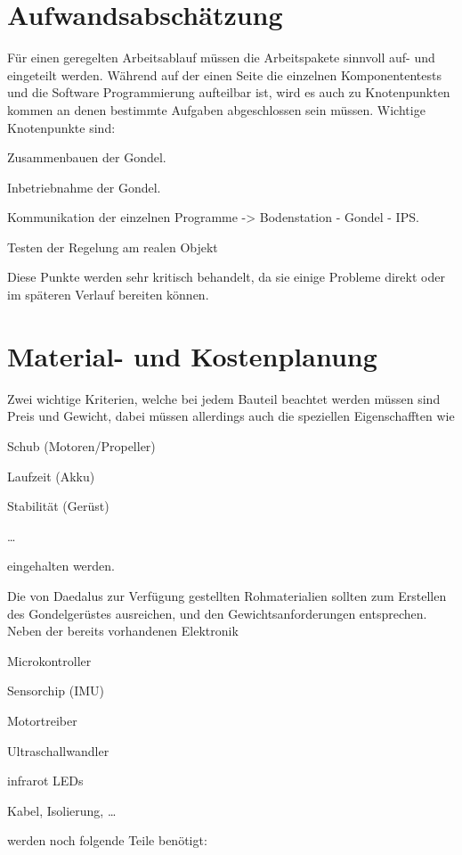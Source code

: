 \documentclass[lang=ngerman,inputenc=utf8,fontsize=10pt]{ldvarticle}
\begin{document}
\section{Aufwandsabschätzung}

Für einen geregelten Arbeitsablauf müssen die Arbeitspakete sinnvoll auf- und eingeteilt werden.
Während auf der einen Seite die einzelnen Komponententests und die Software Programmierung aufteilbar ist, wird es auch zu Knotenpunkten kommen an denen bestimmte Aufgaben abgeschlossen sein müssen. Wichtige Knotenpunkte sind:
\begin{list}{-}{}

\item Zusammenbauen der Gondel.
\item Inbetriebnahme der Gondel.
\item Kommunikation der einzelnen Programme -> Bodenstation - Gondel - IPS.
\item Testen der Regelung am realen Objekt
\end{list}

Diese Punkte werden sehr kritisch behandelt, da sie einige Probleme direkt oder im späteren Verlauf bereiten können.


\section{Material- und Kostenplanung}


Zwei wichtige Kriterien, welche bei jedem Bauteil beachtet werden müssen sind Preis und Gewicht, dabei müssen allerdings auch die speziellen Eigenschafften wie
\begin{list}{-}{}
\item Schub (Motoren/Propeller)
\item Laufzeit (Akku)
\item Stabilität (Gerüst)
\item …
\end{list}
eingehalten werden.

Die von Daedalus zur Verfügung gestellten Rohmaterialien sollten zum Erstellen des Gondelgerüstes ausreichen, und den Gewichtsanforderungen entsprechen. Neben der bereits vorhandenen Elektronik
\begin{list}{-}{}
\item Microkontroller
\item Sensorchip (IMU)
\item Motortreiber
\item Ultraschallwandler
\item infrarot LEDs
\item Kabel, Isolierung, …
\end{list}
werden noch folgende Teile benötigt:
\end{document}
